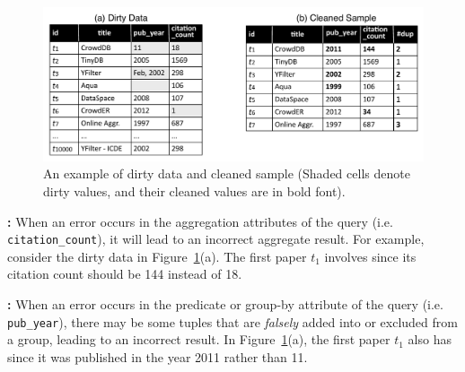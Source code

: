 \vspace{.5em}

\begin{figure}[tup] %
\includegraphics[scale=0.35]{figs/new-example.pdf}\vspace{-1em}
\caption{An example of dirty data and cleaned sample (Shaded cells denote dirty values, and their cleaned values are in bold font).}\vspace{-1.5em}
\label{fig:example}
\end{figure}

{\noindent \bf \Verror:} When an error occurs in the aggregation attributes of the query (i.e. \texttt{citation\_count}), it will lead to an incorrect aggregate result. For example, consider the dirty data in Figure~\ref{fig:example}(a). The first paper $t_1$ involves \verror since its citation count should be 144 instead of 18. %



\vspace{.5em}

{\noindent \bf \Cerror:} When an error occurs in the predicate or group-by attribute of the query (i.e. \texttt{pub\_year}), there may be some tuples that are \emph{falsely} added into or excluded from a group, leading to an incorrect result. In Figure~\ref{fig:example}(a), the first paper $t_1$ also has \cerror since it was published in the year 2011 rather than 11. %

